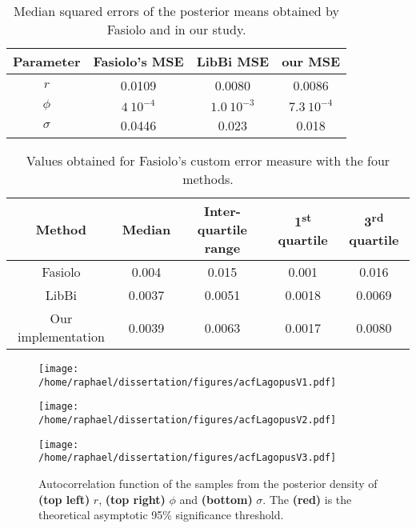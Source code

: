 \documentclass[12pt]{article}
\newcommand{\ra}[1]{\renewcommand{\arraystretch}{#1}}
\begin{document}
	\begin{table}[htb]
		\centering
		\ra{1.3}
		\begin{tabular}{@{}cccc@{}} \toprule
			Parameter & Fasiolo's MSE & LibBi MSE & our MSE\\ \midrule 
			$r$ & 0.0109 & 0.0080 &  0.0086 \\ 
			$\phi$ & $4 \ 10^{-4}$ & $1.0 \ 10^{-3}$ &  $7.3 \ 10^{-4}$ \\ 
			$\sigma$ & 0.0446 & 0.023 & 0.018  \\ \bottomrule
		\end{tabular}
		\caption{Median squared errors of the posterior means obtained by Fasiolo and in our study.}
		\label{table:mse}
	\end{table}

	\begin{table}[htb]
		\centering
		\ra{1.3}
		\begin{tabular}{@{}ccccc@{}} \toprule
			Method & Median &  Inter-quartile range & 1\textsuperscript{st} quartile & 3\textsuperscript{rd} quartile \\ \midrule 
			Fasiolo & 0.004 & 0.015 & 0.001 & 0.016\\ 
			LibBi & 0.0037 & 0.0051 &0.0018 & 0.0069 \\ 
			Our implementation & 0.0039 &  0.0063 & 0.0017 & 0.0080\\ \bottomrule
		\end{tabular}
		\caption{Values obtained for Fasiolo's custom error measure with the four methods.}
		\label{table:metric}
	\end{table}
	
	\begin{figure}[htb]
		\centering
		\begin{minipage}{0.4\textwidth}
			\centering
			\texttt{[image: /home/raphael/dissertation/figures/acfLagopusV1.pdf]}
		\end{minipage}
		\begin{minipage}{0.4\textwidth}
			\centering
			\texttt{[image: /home/raphael/dissertation/figures/acfLagopusV2.pdf]}
		\end{minipage}
		\begin{minipage}{0.4\textwidth}
			\centering
			\texttt{[image: /home/raphael/dissertation/figures/acfLagopusV3.pdf]}
		\end{minipage}
		\caption{Autocorrelation function of the samples from the posterior density of \textbf{(top left)} $r$, \textbf{(top right)} $\phi$ and \textbf{(bottom)} $\sigma$. The \textbf{(red)} is the theoretical asymptotic 95\% significance threshold.}
		\label{fig:acfLagopus}
	\end{figure}
	
\end{document}
